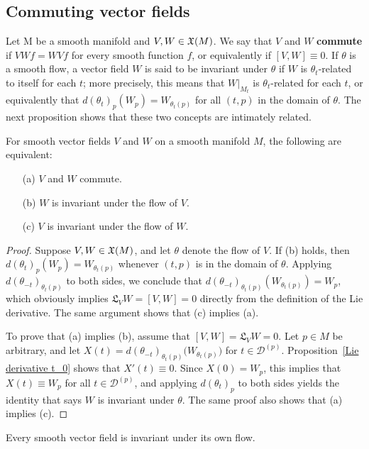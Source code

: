\subsection{Commuting vector fields}
Let M be a smooth manifold and $V,W\in\mathfrak{X}(M)$. We say that $V$ and $W$ \textbf{commute} if $VWf=WVf$ for every smooth function $f$, or equivalently if $[V,W]\equiv0$. If $\theta$ is a smooth flow, a vector field $W$ is said to be invariant under $\theta$ if $W$ is $\theta_t$-related to itself for each $t$; more precisely, this means that $W|_{M_t}$ is $\theta_t$-related for each $t$, or equivalently that $d(\theta_t)_p(W_p)=W_{\theta_t(p)}$ for all $(t,p)$ in the domain of $\theta$. The next proposition shows that these two concepts are intimately related.
\begin{theorem}\label{vector field commute iff}
For smooth vector fields $V$ and $W$ on a smooth manifold $M$, the following are equivalent:
\begin{itemize}
\item[(a)] $V$ and $W$ commute.
\item[(b)] $W$ is invariant under the flow of $V$.
\item[(c)] $V$ is invariant under the flow of $W$.
\end{itemize}
\end{theorem}
\begin{proof}
Suppose $V,W\in\mathfrak{X}(M)$, and let $\theta$ denote the flow of $V$. If (b) holds, then $d(\theta_t)_p(W_p)=W_{\theta_t(p)}$ whenever $(t,p)$ is in the domain of $\theta$. Applying $d(\theta_{-t})_{\theta_t(p)}$ to both sides, we conclude that $d(\theta_{-t})_{\theta_t(p)}(W_{\theta_t(p)})=W_p$, which obviously implies $\mathfrak{L}_VW=[V,W]=0$ directly from the definition of the Lie derivative. The same argument shows that (c) implies (a).\par
To prove that (a) implies (b), assume that $[V,W]=\mathfrak{L}_VW=0$. Let $p\in M$ be arbitrary, and let $X(t)=d(\theta_{-t})_{\theta_t(p)}\big(W_{\theta_t(p)}\big)$ for $t\in\mathcal{D}^{(p)}$. Proposition~\ref{Lie derivative t_0} shows that $X'(t)\equiv 0$. Since $X(0)=W_p$, this implies that $X(t)\equiv W_p$ for all $t\in\mathcal{D}^{(p)}$, and applying $d(\theta_t)_p$ to both sides yields the identity that says $W$ is invariant under $\theta$. The same proof also shows that (a) implies (c).
\end{proof}
\begin{corollary}
Every smooth vector field is invariant under its own flow.
\end{corollary}
